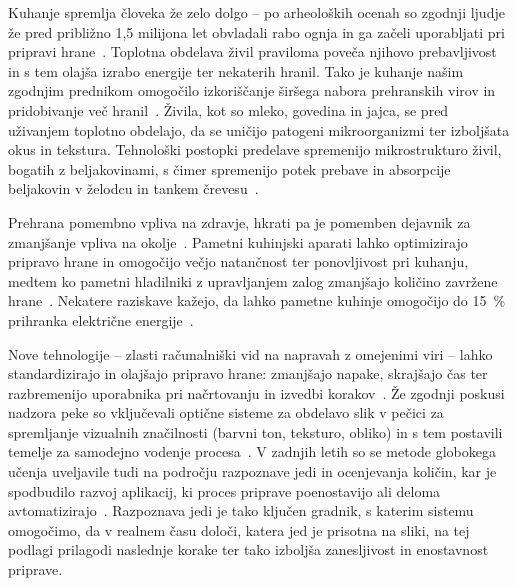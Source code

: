 \documentclass[a4paper,twoside,openright,12pt,slovene]{book}
\begin{document}
    Kuhanje spremlja človeka že zelo dolgo -- po arheoloških
    ocenah so zgodnji ljudje že pred približno 1,5 milijona let obvladali rabo
    ognja in ga začeli uporabljati pri pripravi
    hrane~\cite{src:myhrvold_cooking_2025}.
    Toplotna obdelava živil praviloma poveča njihovo prebavljivost in s tem
    olajša izrabo energije ter nekaterih hranil. Tako je kuhanje našim zgodnjim
        prednikom omogočilo izkoriščanje širšega nabora prehranskih virov in
    pridobivanje več hranil~\cite{src:myhrvold_cooking_2025}. Živila, kot so mleko,
    govedina in jajca, se pred uživanjem toplotno obdelajo, da se uničijo
    patogeni mikroorganizmi ter izboljšata okus in tekstura. Tehnološki
    postopki predelave spremenijo mikrostrukturo živil, bogatih z
    beljakovinami, s čimer spremenijo potek prebave in absorpcije beljakovin
    v želodcu in tankem črevesu~\cite{src:Loveday_2023}.

    Prehrana pomembno vpliva na zdravje, hkrati pa je pomemben dejavnik za
    zmanjšanje vpliva na okolje~\cite{src:eat2019food}.
    Pametni kuhinjski aparati lahko optimizirajo pripravo hrane in omogočijo
    večjo natančnost ter ponovljivost pri kuhanju, medtem ko pametni hladilniki
    z upravljanjem zalog zmanjšajo količino zavržene
    hrane~\cite{src:GOLSHANY2025116557}. Nekatere raziskave kažejo, da lahko
    pametne kuhinje omogočijo do 15~\% prihranka električne energije~\cite{src:GOLSHANY2025116557}.

    Nove tehnologije -- zlasti računalniški vid na napravah z omejenimi viri --
    lahko standardizirajo in olajšajo pripravo hrane: zmanjšajo napake,
    skrajšajo čas ter razbremenijo uporabnika pri načrtovanju in izvedbi
    korakov~\cite{src:GOLSHANY2025116557}. Že zgodnji poskusi nadzora peke so vključevali optične sisteme za
    obdelavo slik v pečici za spremljanje vizualnih značilnosti (barvni ton,
    teksturo, obliko) in s tem postavili temelje za samodejno vodenje
    procesa~\cite{src:paquet2012monitoring}. V zadnjih letih so se metode
    globokega učenja uveljavile tudi na področju razpoznave jedi in ocenjevanja
    količin, kar je spodbudilo razvoj aplikacij, ki proces priprave
    poenostavijo ali deloma avtomatizirajo~\cite{src:SEDEJ_2023,
    src:Nikodinovska_2024}.
    Razpoznava jedi je tako ključen gradnik, s katerim sistemu omogočimo, da v
    realnem času določi, katera jed je prisotna na sliki, na tej podlagi
    prilagodi naslednje korake ter tako izboljša zanesljivost in enostavnost priprave.
\end{document}
